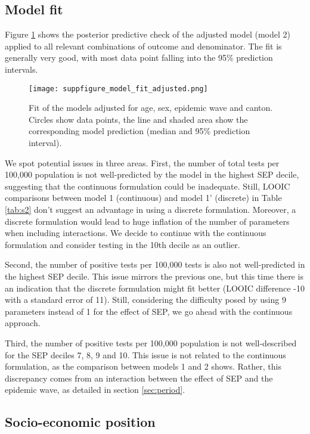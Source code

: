 \documentclass{article}
\begin{document}
	\subsection{Model fit}
	\label{sec:fit}
	Figure \ref{fig:fig-fit} shows the posterior predictive check of the adjusted model (model 2) applied to all relevant combinations of outcome and denominator.
	The fit is generally very good, with most data point falling into the 95\% prediction intervals.
	
	
	\begin{figure}[H]
		\centering
		\texttt{[image: suppfigure\_model\_fit\_adjusted.png]}
		\caption{Fit of the models adjusted for age, sex, epidemic wave and canton. Circles show data points, the line and shaded area show the corresponding model prediction (median and 95\% prediction interval).}
		\label{fig:fig-fit}
	\end{figure}
	
	We spot potential issues in three areas.
	First, the number of total tests per 100,000 population is not well-predicted by the model in the highest SEP decile, suggesting that the continuous formulation could be inadequate.
	Still, LOOIC comparisons between model 1 (continuous) and model 1' (discrete) in Table \ref{tab:s2} don't suggest an advantage in using a discrete formulation. 
	Moreover, a discrete formulation would lead to huge inflation of the number of parameters when including interactions. 
	We decide to continue with the continuous formulation and consider testing in the 10th decile as an outlier.
	
	Second, the number of positive tests per 100,000 tests is also not well-predicted in the highest SEP decile. 
	This issue mirrors the previous one, but this time there is an indication that the discrete formulation might fit better (LOOIC difference -10 with a standard error of 11).
	Still, considering the difficulty posed by using 9 parameters instead of 1 for the effect of SEP, we go ahead with the continuous approach.
	
	Third, the number of positive tests per 100,000 population is not well-described for the SEP deciles 7, 8, 9 and 10.
	This issue is not related to the continuous formulation, as the comparison between models 1 and 2 shows.
	Rather, this discrepancy comes from an interaction between the effect of SEP and the epidemic wave, as detailed in section \ref{sec:period}.

	
	
	\subsection{Socio-economic position}
	
\end{document}

